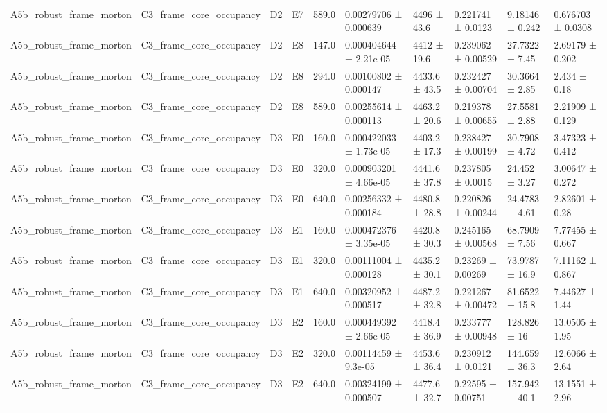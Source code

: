 \begin{table}
\begin{tabular}{llllllllll}
A5b\_robust\_frame\_morton & C3\_frame\_core\_occupancy & D2 & E7 & 589.0 & 0.00279706 ± 0.000639 & 4496 ± 43.6 & 0.221741 ± 0.0123 & 9.18146 ± 0.242 & 0.676703 ± 0.0308 \\
A5b\_robust\_frame\_morton & C3\_frame\_core\_occupancy & D2 & E8 & 147.0 & 0.000404644 ± 2.21e-05 & 4412 ± 19.6 & 0.239062 ± 0.00529 & 27.7322 ± 7.45 & 2.69179 ± 0.202 \\
A5b\_robust\_frame\_morton & C3\_frame\_core\_occupancy & D2 & E8 & 294.0 & 0.00100802 ± 0.000147 & 4433.6 ± 43.5 & 0.232427 ± 0.00704 & 30.3664 ± 2.85 & 2.434 ± 0.18 \\
A5b\_robust\_frame\_morton & C3\_frame\_core\_occupancy & D2 & E8 & 589.0 & 0.00255614 ± 0.000113 & 4463.2 ± 20.6 & 0.219378 ± 0.00655 & 27.5581 ± 2.88 & 2.21909 ± 0.129 \\
A5b\_robust\_frame\_morton & C3\_frame\_core\_occupancy & D3 & E0 & 160.0 & 0.000422033 ± 1.73e-05 & 4403.2 ± 17.3 & 0.238427 ± 0.00199 & 30.7908 ± 4.72 & 3.47323 ± 0.412 \\
A5b\_robust\_frame\_morton & C3\_frame\_core\_occupancy & D3 & E0 & 320.0 & 0.000903201 ± 4.66e-05 & 4441.6 ± 37.8 & 0.237805 ± 0.0015 & 24.452 ± 3.27 & 3.00647 ± 0.272 \\
A5b\_robust\_frame\_morton & C3\_frame\_core\_occupancy & D3 & E0 & 640.0 & 0.00256332 ± 0.000184 & 4480.8 ± 28.8 & 0.220826 ± 0.00244 & 24.4783 ± 4.61 & 2.82601 ± 0.28 \\
A5b\_robust\_frame\_morton & C3\_frame\_core\_occupancy & D3 & E1 & 160.0 & 0.000472376 ± 3.35e-05 & 4420.8 ± 30.3 & 0.245165 ± 0.00568 & 68.7909 ± 7.56 & 7.77455 ± 0.667 \\
A5b\_robust\_frame\_morton & C3\_frame\_core\_occupancy & D3 & E1 & 320.0 & 0.00111004 ± 0.000128 & 4435.2 ± 30.1 & 0.23269 ± 0.00269 & 73.9787 ± 16.9 & 7.11162 ± 0.867 \\
A5b\_robust\_frame\_morton & C3\_frame\_core\_occupancy & D3 & E1 & 640.0 & 0.00320952 ± 0.000517 & 4487.2 ± 32.8 & 0.221267 ± 0.00472 & 81.6522 ± 15.8 & 7.44627 ± 1.44 \\
A5b\_robust\_frame\_morton & C3\_frame\_core\_occupancy & D3 & E2 & 160.0 & 0.000449392 ± 2.66e-05 & 4418.4 ± 36.9 & 0.233777 ± 0.00948 & 128.826 ± 16 & 13.0505 ± 1.95 \\
A5b\_robust\_frame\_morton & C3\_frame\_core\_occupancy & D3 & E2 & 320.0 & 0.00114459 ± 9.3e-05 & 4453.6 ± 36.4 & 0.230912 ± 0.0121 & 144.659 ± 36.3 & 12.6066 ± 2.64 \\
A5b\_robust\_frame\_morton & C3\_frame\_core\_occupancy & D3 & E2 & 640.0 & 0.00324199 ± 0.000507 & 4477.6 ± 32.7 & 0.22595 ± 0.00751 & 157.942 ± 40.1 & 13.1551 ± 2.96 \\

\end{tabular}
\end{table}
